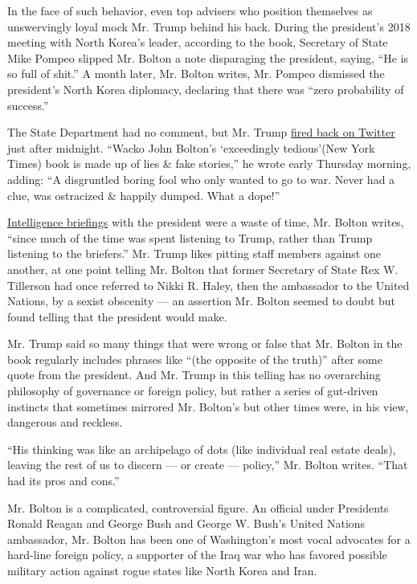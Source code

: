 In the face of such behavior, even top advisers who position themselves
as unswervingly loyal mock Mr. Trump behind his back. During the
president's 2018 meeting with North Korea's leader, according to the
book, Secretary of State Mike Pompeo slipped Mr. Bolton a note
disparaging the president, saying, ``He is so full of shit.'' A month
later, Mr. Bolton writes, Mr. Pompeo dismissed the president's North
Korea diplomacy, declaring that there was ``zero probability of
success.''

The State Department had no comment, but Mr. Trump
\href{https://twitter.com/realDonaldTrump/status/1273468029712707584}{fired
back on Twitter} just after midnight. ``Wacko John Bolton's `exceedingly
tedious'(New York Times) book is made up of lies \& fake stories,'' he
wrote early Thursday morning, adding: ``A disgruntled boring fool who
only wanted to go to war. Never had a clue, was ostracized \& happily
dumped. What a dope!''

\href{https://www.nytimes3xbfgragh.onion/2020/05/21/us/politics/presidents-daily-brief-trump.html}{Intelligence
briefings} with the president were a waste of time, Mr. Bolton writes,
``since much of the time was spent listening to Trump, rather than Trump
listening to the briefers.'' Mr. Trump likes pitting staff members
against one another, at one point telling Mr. Bolton that former
Secretary of State Rex W. Tillerson had once referred to Nikki R. Haley,
then the ambassador to the United Nations, by a sexist obscenity --- an
assertion Mr. Bolton seemed to doubt but found telling that the
president would make.

Mr. Trump said so many things that were wrong or false that Mr. Bolton
in the book regularly includes phrases like ``(the opposite of the
truth)'' after some quote from the president. And Mr. Trump in this
telling has no overarching philosophy of governance or foreign policy,
but rather a series of gut-driven instincts that sometimes mirrored Mr.
Bolton's but other times were, in his view, dangerous and reckless.

``His thinking was like an archipelago of dots (like individual real
estate deals), leaving the rest of us to discern --- or create ---
policy,'' Mr. Bolton writes. ``That had its pros and cons.''

Mr. Bolton is a complicated, controversial figure. An official under
Presidents Ronald Reagan and George Bush and George W. Bush's United
Nations ambassador, Mr. Bolton has been one of Washington's most vocal
advocates for a hard-line foreign policy, a supporter of the Iraq war
who has favored possible military action against rogue states like North
Korea and Iran.

